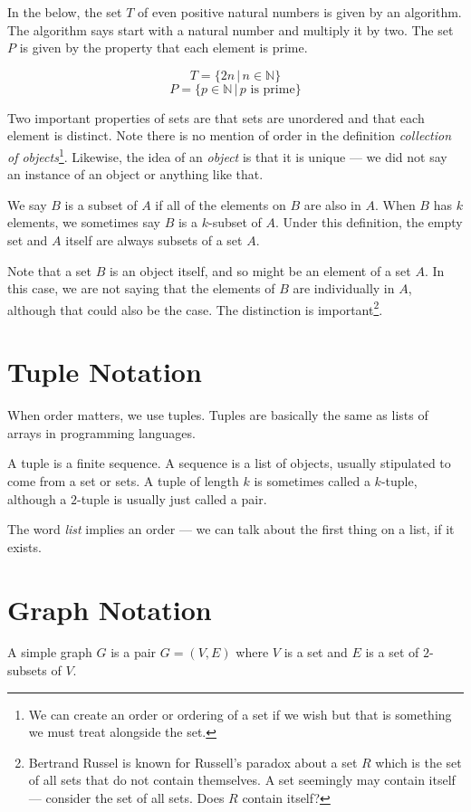 \documentclass{notes}
\begin{document}
  In the below, the set $T$ of even positive natural numbers is given by an algorithm.
  The algorithm says start with a natural number and multiply it by two.
  The set $P$ is given by the property that each element is prime.

  $$ T = \{ 2n \, | \, n \in \mathbb{N} \} $$
  $$ P = \{ p \in \mathbb{N} \, | \, p \textrm{ is prime} \} $$

  Two important properties of sets are that sets are unordered and that each element is distinct.
  Note there is no mention of order in the definition \emph{collection of objects}\footnote{We can create an order or ordering of a set if we wish but that is something we must treat alongside the set.}.
  Likewise, the idea of an \emph{object} is that it is unique --- we did not say an instance of an object or anything like that.

  We say $B$ is a subset of $A$ if all of the elements on $B$ are also in $A$.
  When $B$ has $k$ elements, we sometimes say $B$ is a $k$-subset of $A$.
  Under this definition, the empty set and $A$ itself are always subsets of a set $A$.

  Note that a set $B$ is an object itself, and so might be an element of a set $A$.
  In this case, we are not saying that the elements of $B$ are individually in $A$, although that could also be the case.
  The distinction is important\footnote{Bertrand Russel is known for Russell's paradox about a set $R$ which is the set of all sets that do not contain themselves. A set seemingly may contain itself --- consider the set of all sets. Does $R$ contain itself?}.


\section{Tuple Notation}
  When order matters, we use tuples.
  Tuples are basically the same as lists of arrays in programming languages.

  A tuple is a finite sequence\autocite[6]{sipser}.
  A sequence is a list of objects, usually stipulated to come from a set or sets.
  A tuple of length $k$ is sometimes called a $k$-tuple, although a $2$-tuple is usually just called a pair.

  The word \emph{list} implies an order --- we can talk about the first thing on a list, if it exists.

\section{Graph Notation}
  A simple graph $G$ is a pair \(G = (V,E)\) where $V$ is a set and $E$ is a set of $2$-subsets of $V$.
\end{document}
